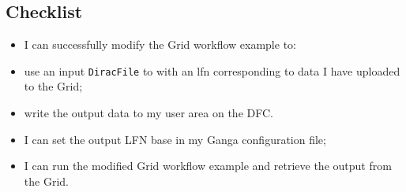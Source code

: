 \subsection{Checklist}
\label{using-grid-based-data-in-your-workflow---checklist}

\begin{itemize}
\tightlist
\item
  I can successfully modify the Grid workflow example to:
\item
  use an input \texttt{DiracFile} to with an lfn corresponding to data I
  have uploaded to the Grid;
\item
  write the output data to my user area on the DFC.
\item
  I can set the output LFN base in my Ganga configuration file;
\item
  I can run the modified Grid workflow example and retrieve the output
  from the Grid.
\end{itemize}
